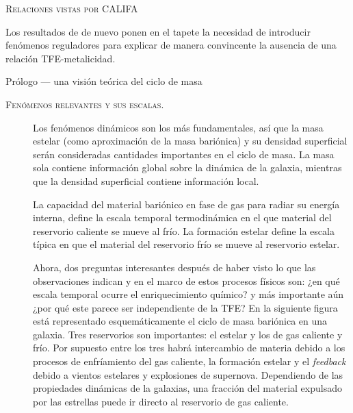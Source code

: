 \documentclass[xcolor=dvipsnames,4pt,hyperref={colorlinks,citecolor=black,linkcolor=black,urlcolor=black}]{beamer}
\begin{document}
\begin{frame}[allowframebreaks]{\textsc{Relaciones vistas por CALIFA}}
\begin{description}
Los resultados de \citeauthor{Sanchez2013} de nuevo ponen en el tapete la necesidad de introducir
fenómenos reguladores para explicar de manera convincente la ausencia de una relación
TFE-metalicidad.
%
\end{description}
\end{frame}

\begin{frame}[allowframebreaks]{Prólogo --- una visión teórica del ciclo de masa}
%
\begin{description}
%
\item[\textsc{Fenómenos relevantes y sus escalas.}] Los fenómenos dinámicos son los más
fundamentales, así que la masa estelar (como aproximación de la masa bariónica) y su densidad
superficial serán consideradas cantidades importantes en el ciclo de masa. La masa sola contiene
información global sobre la dinámica de la galaxia, mientras que la densidad superficial contiene
información local.

La capacidad del material bariónico en fase de gas para radiar su energía interna, define la escala
temporal termodinámica en el que material del reservorio caliente se mueve al frío.
La formación estelar define la escala típica en que el material del reservorio frío se mueve al
reservorio estelar.

Ahora, dos preguntas interesantes después de haber visto lo que las observaciones indican y en el
marco de estos procesos físicos son:
%
¿en qué escala temporal ocurre el enriquecimiento químico?
%
y más importante aún ¿por qué este parece ser independiente de la TFE?
%
En la siguiente figura
está representado esquemáticamente el ciclo de masa bariónica en una galaxia.
Tres reservorios son importantes: el estelar y los de gas caliente y frío. Por supuesto entre los
tres habrá intercambio de materia debido a los procesos de enfríamiento del gas caliente, la
formación estelar y el \emph{feedback} debido a vientos estelares y explosiones de supernova.
Dependiendo de las propiedades dinámicas de la galaxias, una fracción del material expulsado por las
estrellas puede ir directo al reservorio de gas caliente.


\end{description}
\end{frame}
\end{document}
